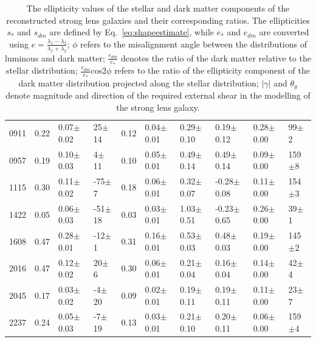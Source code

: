 \documentclass[useAMS,usenatbib]{mn2e}
\begin{document}
\begin{table}
\begin{center}
\begin{tabular}{l | l l l l l l l l l}
      0911 & 0.22 & 0.07$\pm$0.02 & 25$\pm$14 & 0.12 & 0.04$\pm$0.01 & 0.29$\pm$0.10 & 0.19$\pm$0.12 & 0.28$\pm$0.00 & 99$\pm$2 \\
      0957 & 0.19 & 0.10$\pm$0.03 & 4$\pm$11 & 0.10 & 0.05$\pm$0.01 & 0.49$\pm$0.14 & 0.49$\pm$0.14 & 0.09$\pm$0.00 & 159$\pm$8 \\
      1115 & 0.30 & 0.11$\pm$0.02 & -75$\pm$7 & 0.18 & 0.06$\pm$0.01 & 0.32$\pm$0.07 & -0.28$\pm$0.08 & 0.11$\pm$0.00 & 154$\pm$3 \\
      1422 & 0.05 & 0.06$\pm$0.03 & -51$\pm$18 & 0.03 & 0.03$\pm$0.01 & 1.03$\pm$0.51 & -0.23$\pm$0.65 & 0.26$\pm$0.00 & 39$\pm$1 \\
      1608 & 0.47 & 0.28$\pm$0.01 & -12$\pm$1 & 0.31 & 0.16$\pm$0.01 & 0.53$\pm$0.03 & 0.48$\pm$0.03 & 0.19$\pm$0.00 & 145$\pm$2 \\
      2016 & 0.47 & 0.12$\pm$0.02 & 20$\pm$6 & 0.30 & 0.06$\pm$0.01 & 0.21$\pm$0.04 & 0.16$\pm$0.04 & 0.14$\pm$0.00 & 42$\pm$4 \\
      2045 & 0.17 & 0.03$\pm$0.02 & -4$\pm$20 & 0.09 & 0.02$\pm$0.01 & 0.19$\pm$0.11 & 0.19$\pm$0.11 & 0.11$\pm$0.00 & 23$\pm$7 \\
      2237 & 0.24 & 0.05$\pm$0.03 & -7$\pm$19 & 0.13 & 0.03$\pm$0.01 & 0.21$\pm$0.10 & 0.20$\pm$0.11 & 0.06$\pm$0.00 & 159$\pm$4 \\
    \end{tabular}
    \caption[width=\linewidth]{The ellipticity values of the stellar and dark matter components of the reconstructed strong lens galaxies and their corresponding ratios. The ellipticities $s_{*}$ and $s_{dm}$ are defined by Eq.~\ref{eq:shapeestimate}, while $e_{*}$ and $e_{dm}$ are converted using $e = \frac{\lambda_1-\lambda_2}{\lambda_1+\lambda_2}$; $\phi$ refers to the misalignment angle between the distributions of luminous and dark matter; $\frac{e_{dm}}{e_{*}}$ denotes the ratio of the dark matter relative to the stellar distribution; $\frac{e_{dm}}{e_{*}}\mathrm{cos} 2\phi$ refers to the ratio of the ellipticity component of the dark matter distribution projected along the stellar distribution; $|\gamma|$ and $\theta_{g}$ denote magnitude and direction of the required external shear in the modelling of the strong lens galaxy.}
    \label{tab:ellipratios}
  \end{center}
\end{table}
\end{document}
